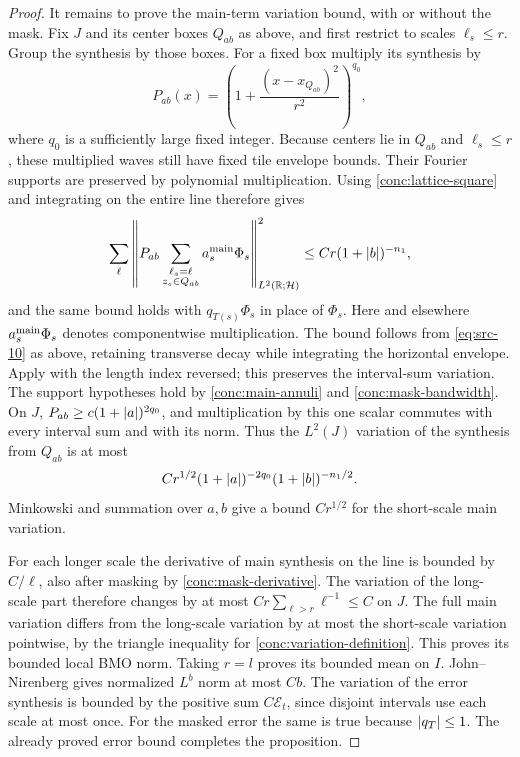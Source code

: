 \begin{proof}
It remains to prove the main-term variation bound, with or without
the mask.  Fix $J$ and its center boxes $Q_{ab}$ as above, and first
restrict to scales $\ell_s\leq r$.  Group the synthesis by those boxes.
For a fixed box multiply its synthesis by
\[
 P_{ab}(x)=\left(1+\frac{(x-x_{Q_{ab}})^2}{r^2}\right)^{q_0},
\]
where $q_0$ is a sufficiently large fixed integer.  Because
centers lie in $Q_{ab}$ and $\ell_s\leq r$,
these multiplied waves still have fixed tile envelope bounds.
Their Fourier supports are preserved by polynomial multiplication.
Using \eqref{conc:lattice-square} and integrating on the entire line
therefore gives
\[
 \sum_\ell\left\|P_{ab}
   \sum_{\substack{\ell_s=\ell\\z_s\in Q_{ab}}}
       a_s^{\rm main}\Phi_s\right\|_{L^2(\mathbb R;\mathcal H)}^2
 \leq Cr(1+\left|b\right|)^{-n_1},
\]
and the same bound holds with $q_{T(s)}\Phi_s$ in place of $\Phi_s$.
Here and elsewhere $a_s^{\rm main}\Phi_s$ denotes componentwise
multiplication.  The bound follows from \eqref{eq:src-10} as above,
retaining transverse decay while integrating the horizontal envelope.
Apply  with the length index reversed;
this preserves the interval-sum variation.  The support hypotheses hold by
\eqref{conc:main-annuli} and \eqref{conc:mask-bandwidth}.  On $J$,
$P_{ab}\geq c(1+\left|a\right|)^{2q_0}$, and multiplication by this one scalar
commutes with every interval sum and with its norm.  Thus the
$L^2(J)$ variation of the synthesis from $Q_{ab}$ is at most
\[
 Cr^{1/2}(1+\left|a\right|)^{-2q_0}(1+\left|b\right|)^{-n_1/2}.
\]
Minkowski and summation over $a,b$ give a bound $Cr^{1/2}$ for the
short-scale main variation.

For each longer scale the derivative of main synthesis on the line
is bounded by $C/\ell$, also after masking by
\eqref{conc:mask-derivative}.  The variation of the long-scale part
therefore changes by at most
$Cr\sum_{\ell>r}\ell^{-1}\leq C$ on $J$.
The full main variation differs from the long-scale variation by at
most the short-scale variation pointwise, by the triangle inequality
for \eqref{conc:variation-definition}.  This proves its bounded local
BMO norm.  Taking $r=l$ proves its bounded mean on $I$.
John--Nirenberg gives normalized $L^b$ norm at most $Cb$.
The variation of the error synthesis is bounded by the positive sum
$C\mathcal E_t$, since disjoint intervals use each scale at most once.
For the masked error the same is true because $\left|q_T\right|\leq1$.
The already proved error bound completes the proposition.
\end{proof}

